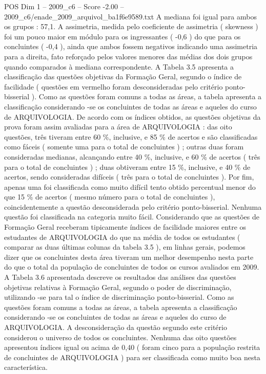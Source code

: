 \begin{textsample}{POS Dim 1 – 2009\_c6 – Score -2.00 – 2009\_c6/enade\_2009\_arquivol\_ba1f6e9589.txt}
A mediana foi igual para ambos os grupos : 57,1.
A assimetria, medida pelo coeficiente de assimetria ( skewness ) foi um pouco maior em módulo para os ingressantes ( -0,6 ) do que para os concluintes ( -0,4 ), ainda que ambos fossem negativos indicando uma assimetria para a direita, fato reforçado pelos valores menores das médias dos dois grupos quando comparados à mediana correspondente.
A Tabela 3.5 apresenta a classificação das questões objetivas da Formação Geral, segundo o índice de facilidade ( questões em vermelho foram desconsideradas pelo critério ponto-bisserial ).
Como as questões foram comuns a todas as áreas, a tabela apresenta a classificação considerando -se os concluintes de todas as áreas e aqueles do curso de ARQUIVOLOGIA.
De acordo com os índices obtidos, as questões objetivas da prova foram assim avaliadas para a área de ARQUIVOLOGIA : das oito questões, três tiveram entre 60 \%, inclusive, e 85 \% de acertos e são classificadas como fáceis ( somente uma para o total de concluintes ) ; outras duas foram consideradas medianas, alcançando entre 40 \%, inclusive, e 60 \% de acertos ( três para o total de concluintes ) ; duas obtiveram entre 15 \%, inclusive, e 40 \% de acertos, sendo consideradas difíceis ( três para o total de concluintes ).
Por fim, apenas uma foi classificada como muito difícil tento obtido percentual menor do que 15 \% de acertos ( mesmo número para o total de concluintes ), coincidentemente a questão desconsiderada pelo critério ponto-bisserial.
Nenhuma questão foi classificada na categoria muito fácil.
Considerando que as questões de Formação Geral receberam tipicamente índices de facilidade maiores entre os estudantes de ARQUIVOLOGIA do que na média de todos os estudantes ( comparar as duas últimas colunas da tabela 3.5 ), em linhas gerais, podemos dizer que os concluintes desta área tiveram um melhor desempenho nesta parte do que o total da população de concluintes de todos os cursos avaliados em 2009.
A Tabela 3.6 apresentada descreve os resultados das análises das questões objetivas relativas à Formação Geral, segundo o poder de discriminação, utilizando -se para tal o índice de discriminação ponto-bisserial.
Como as questões foram comuns a todas as áreas, a tabela apresenta a classificação considerando -se os concluintes de todas as áreas e aqueles do curso de ARQUIVOLOGIA.
A desconsideração da questão segundo este critério considerou o universo de todos os concluintes.
Nenhuma das oito questões apresentou índices igual ou acima de 0,40 ( foram cinco para a população restrita de concluintes de ARQUIVOLOGIA ) para ser classificada como muito boa nesta característica.

\end{textsample}
